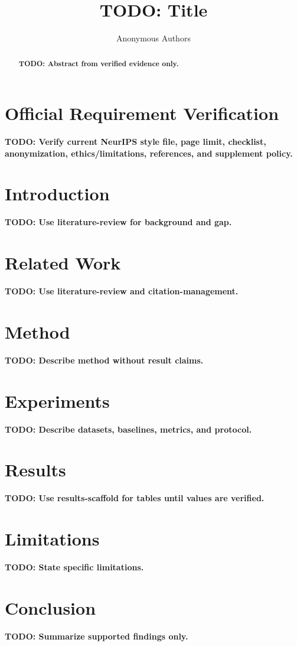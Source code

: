 \documentclass{article}
\title{TODO: Title}
\author{Anonymous Authors}
\date{}
\newcommand{\todo}[1]{\textbf{TODO: #1}}
\begin{document}
\maketitle

\section*{Official Requirement Verification}

\todo{Verify current NeurIPS style file, page limit, checklist, anonymization, ethics/limitations, references, and supplement policy.}

\begin{abstract}
\todo{Abstract from verified evidence only.}
\end{abstract}

\section{Introduction}

\todo{Use literature-review for background and gap.}

\section{Related Work}

\todo{Use literature-review and citation-management.}

\section{Method}

\todo{Describe method without result claims.}

\section{Experiments}

\todo{Describe datasets, baselines, metrics, and protocol.}

\section{Results}

\todo{Use results-scaffold for tables until values are verified.}

\section{Limitations}

\todo{State specific limitations.}

\section{Conclusion}

\todo{Summarize supported findings only.}


% 
\end{document}
